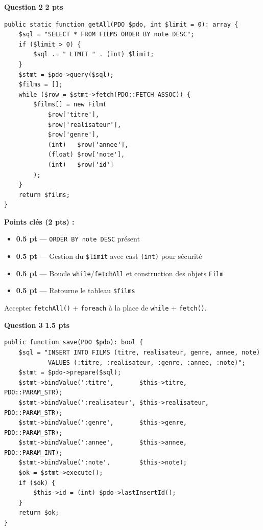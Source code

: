 \documentclass[11pt,a4paper]{article}
\newcommand{\pts}[1]{%
  \hfill\colorbox{pointsbg}{\textcolor{uirgold}{\bfseries\small #1 pts}}%
}
\begin{document}
\bigskip

\noindent\textbf{Question 2}\pts{2}

\begin{tcolorbox}[corrbox, title={Corrigé Q2 --- getAll()}]
\begin{lstlisting}[language=PHP2]
public static function getAll(PDO $pdo, int $limit = 0): array {
    $sql = "SELECT * FROM FILMS ORDER BY note DESC";
    if ($limit > 0) {
        $sql .= " LIMIT " . (int) $limit;
    }
    $stmt = $pdo->query($sql);
    $films = [];
    while ($row = $stmt->fetch(PDO::FETCH_ASSOC)) {
        $films[] = new Film(
            $row['titre'],
            $row['realisateur'],
            $row['genre'],
            (int)   $row['annee'],
            (float) $row['note'],
            (int)   $row['id']
        );
    }
    return $films;
}
\end{lstlisting}
\end{tcolorbox}

\begin{tcolorbox}[notebox]
\textbf{Points clés (2 pts) :}
\begin{itemize}[itemsep=1pt, topsep=0pt]
  \item \textbf{0.5 pt} --- \texttt{ORDER BY note DESC} présent
  \item \textbf{0.5 pt} --- Gestion du \texttt{\$limit} avec cast \texttt{(int)} pour sécurité
  \item \textbf{0.5 pt} --- Boucle \texttt{while}/\texttt{fetchAll} et construction des objets \texttt{Film}
  \item \textbf{0.5 pt} --- Retourne le tableau \texttt{\$films}
\end{itemize}
Accepter \texttt{fetchAll()} + \texttt{foreach} à la place de \texttt{while} + \texttt{fetch()}.
\end{tcolorbox}

\bigskip

\noindent\textbf{Question 3}\pts{1.5}

\begin{tcolorbox}[corrbox, title={Corrigé Q3 --- save()}]
\begin{lstlisting}[language=PHP2]
public function save(PDO $pdo): bool {
    $sql = "INSERT INTO FILMS (titre, realisateur, genre, annee, note)
            VALUES (:titre, :realisateur, :genre, :annee, :note)";
    $stmt = $pdo->prepare($sql);
    $stmt->bindValue(':titre',       $this->titre,       PDO::PARAM_STR);
    $stmt->bindValue(':realisateur', $this->realisateur, PDO::PARAM_STR);
    $stmt->bindValue(':genre',       $this->genre,       PDO::PARAM_STR);
    $stmt->bindValue(':annee',       $this->annee,       PDO::PARAM_INT);
    $stmt->bindValue(':note',        $this->note);
    $ok = $stmt->execute();
    if ($ok) {
        $this->id = (int) $pdo->lastInsertId();
    }
    return $ok;
}
\end{lstlisting}
\end{tcolorbox}
\end{document}
